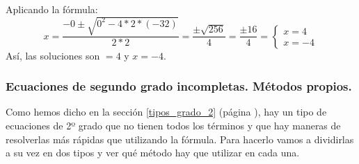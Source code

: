 \documentclass[a4paper,11pt,answers]{exam}
\begin{document}
\begin{enumerate}
\begin{solution}
      Aplicando la fórmula:
      \[x = \frac{-0 \pm \sqrt{0^2 - 4 *2*(-32)}}{2*2} = \frac{\pm \sqrt{256}}{4} = \frac{\pm 16}{4} =
        \begin{cases}
          x= 4\\x= -4
        \end{cases}\]
      Así, las soluciones son $=4$ y $x=-4$.
    \end{solution}
  \end{enumerate}
  
  \subsubsection{Ecuaciones de segundo grado incompletas. Métodos propios.}
  Como hemos dicho en la sección \ref{tipos_grado_2} (página \pageref{tipos_grado_2}), hay un tipo de ecuaciones de 2º grado que no tienen todos los términos y que hay maneras de resolverlas más rápidas que utilizando la fórmula. Para hacerlo vamos a dividirlas a su vez en dos tipos y ver qué método hay que utilizar en cada una.
\end{document}
